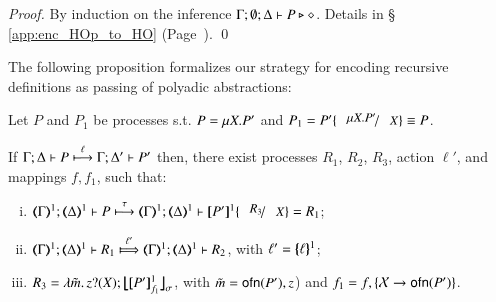 \begin{proof}
	By induction on the inference $\Gamma; \emptyset; \Delta \vdash P \triangleright \diamond$.
	Details in \S\,\ref{app:enc_HOp_to_HO} (Page~\pageref{app:enc_HOp_to_HO}).
	\qed
\end{proof}



The following proposition formalizes our strategy  for encoding
recursive definitions as passing of polyadic abstractions:
%
\begin{proposition}\rm
	\label{prop:op_corr_HOprec_to_HO}
	Let $P$ and $P_1$ be \HOp processes s.t. 
	$P =\mu X. P'$ and
	$P_1 = P'\subst{\recp{X}{P'}}{\varp{X}} \scong P$.

	\noi If %
	$\Gamma; \Delta \vdash P \stackrel{\ell}{\longmapsto} \Gamma; \Delta' \vdash P' $
	then,  there exist
	processes $R_1$, $R_2$,  $R_3$, action $\ell'$,
	and mappings $f, f_1$, such that: 
	\begin{enumerate}[(i)]
	\item 
	$\stytra{\mapt{\Gamma}^{1}}{\tau}{\mapt{\Delta}^{1}}{P}{\mapt{\Delta}^{1}}{\map{P'}^{1}\subst{R_3}{X}} = R_1$;
	\item 
	$\wtytra{\mapt{\Gamma}^{1}}{\ell'}{\mapt{\Delta}^{1}}{R_1}{\mapt{\Delta}^{1}}{R_2} $,  with $\ell' = \{\!\!\{\ell\}\!\!\}^{1}$;
	
	\item $R_3 = \abs{\tilde{m}}\binp{z}{X}\auxmap{\map{P'}^{1}_{f_{1}}}{\sigma}$, with $\tilde{m} = \mathsf{ofn}(P'),z$)
	and
	$f_1 = f, \{\mathcal{X} \to \mathsf{ofn}(P')\}$.
	\end{enumerate}
\end{proposition}

